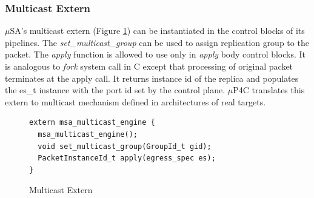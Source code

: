 \documentclass{hotnets19}
\begin{document}


\subsubsection{Multicast Extern}
$\mu$SA's multicast extern (Figure \ref{fig:msa-multicast-extern}) can be instantiated in the control blocks of its pipelines.
The \emph{set\_multicast\_group} can be used to assign replication group to the packet. 
The \emph{apply} function is allowed to use only in \emph{apply} body control blocks. 
It is analogous to \emph{fork} system call in C except that processing of original packet terminates at the apply call.
It returns instance id of the replica and populates the es\_t instance with the port id set by the control plane.
$\mu$P4C translates this extern to multicast mechanism defined in architectures of real targets.
\begin{figure}
\begin{lstlisting}[frame=none]
extern msa_multicast_engine {
  msa_multicast_engine();
  void set_multicast_group(GroupId_t gid);
  PacketInstanceId_t apply(egress_spec es);
}
\end{lstlisting}
\caption{Multicast Extern}
\label{fig:msa-multicast-extern}
\end{figure}
\end{document}
